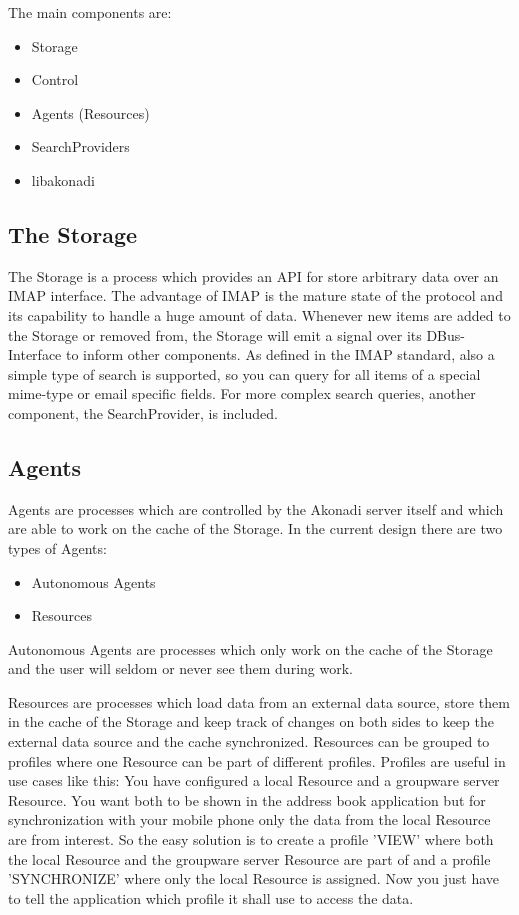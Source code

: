 \documentclass[]{report}
\begin{document}
The main components are:
\begin{itemize}
  \item Storage
  \item Control
  \item Agents (Resources)
  \item SearchProviders
  \item libakonadi
\end{itemize}

\subsection{The Storage}
The Storage is a process which provides an API for store arbitrary data over
an IMAP interface. The advantage of IMAP is the mature state of the protocol
and its capability to handle a huge amount of data.
Whenever new items are added to the Storage or removed from, the Storage will
emit a signal over its DBus-Interface to inform other components.
As defined in the IMAP standard, also a simple type of search is supported,
so you can query for all items of a special mime-type or email specific fields.
For more complex search queries, another component, the SearchProvider, is included.

\subsection{Agents}
Agents are processes which are controlled by the Akonadi server itself and which
are able to work on the cache of the Storage. In the current design there are two
types of Agents:

\begin{itemize}
  \item Autonomous Agents
  \item Resources
\end{itemize}

Autonomous Agents are processes which only work on the cache of the Storage
and the user will seldom or never see them during work.

Resources are processes which load data from an external data source, store them
in the cache of the Storage and keep track of changes on both sides to keep
the external data source and the cache synchronized.
Resources can be grouped to profiles where one Resource can be part of different
profiles. Profiles are useful in use cases like this:
You have configured a local Resource and a groupware server Resource. You want both
to be shown in the address book application but for synchronization with your mobile
phone only the data from the local Resource are from interest. So the easy solution
is to create a profile 'VIEW' where both the local Resource and the groupware server
Resource are part of and a profile 'SYNCHRONIZE' where only the local Resource is
assigned. Now you just have to tell the application which profile it shall use to
access the data.
\end{document}
